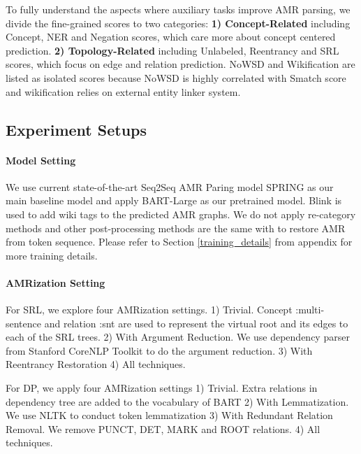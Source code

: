 \documentclass[11pt]{article}
\begin{document}
To fully understand the aspects where auxiliary tasks improve AMR parsing, we divide the fine-grained scores to two categories: \textbf{1) Concept-Related} including Concept, NER and Negation scores, which care more about concept centered prediction. \textbf{2) Topology-Related} including Unlabeled, Reentrancy and SRL scores, which focus on edge and relation prediction. NoWSD and Wikification are listed as isolated scores because NoWSD is highly correlated with Smatch score and wikification relies on external entity linker system.


\subsection{Experiment Setups}
\paragraph{Model Setting}
We use current state-of-the-art Seq2Seq AMR Paring model SPRING \citep{bevil-spring} as our main baseline model and apply BART-Large \citep{lew-bart} as our pretrained model. Blink \citep{li-etal-2020-efficient} is used to add wiki tags to the predicted AMR graphs. We do not apply re-category methods and other post-processing methods are the same with \citet{bevil-spring} to restore AMR from token sequence. Please refer to Section \ref{training_details} from appendix for more training details.






\paragraph{AMRization Setting}
For SRL, we explore four AMRization settings. 1) Trivial. Concept :multi-sentence and relation :snt are used to represent the virtual root and its edges to each of the SRL trees. 2) With Argument Reduction. We use dependency parser from Stanford CoreNLP Toolkit \cite{corenlp} to do the argument reduction.  3) With Reentrancy Restoration 4) All techniques.

For DP, we apply four AMRization settings 1) Trivial. Extra relations in dependency tree are added to the vocabulary of BART 2) With Lemmatization. We use NLTK \citep{bird-2006-nltk} to conduct token lemmatization 3) With Redundant Relation Removal. We remove PUNCT, DET, MARK and ROOT relations. 4) All techniques.
\end{document}

